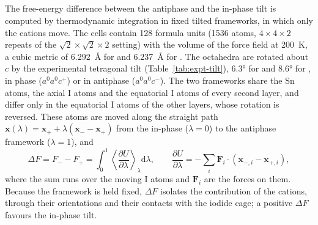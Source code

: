 \subsection{\protect{}}
\label{sec:ti}
{\changedcolor
The free-energy difference between the antiphase and the in-phase tilt is computed by thermodynamic
integration\cite{Kirkwood1935JCP} in fixed tilted frameworks, in which only the cations move. The cells contain 128
formula units (1536 atoms, $4\times4\times2$ repeats of the $\sqrt{2}\times\sqrt{2}\times2$ setting) with the volume of
the force field at \SI{200}{K}, a cubic metric of \SI{6.292}{\angstrom} for \FASnI{} and \SI{6.237}{\angstrom} for
\MASnI{}. The octahedra are rotated about $c$ by the experimental tetragonal tilt (Table~\ref{tab:expt-tilt}), \ang{6.3}
for \FASnI{} and \ang{8.6} for \MASnI{}, in phase ($a^0a^0c^+$) or in antiphase ($a^0a^0c^-$). The two frameworks share
the Sn atoms, the axial I atoms and the equatorial I atoms of every second layer, and differ only in the equatorial I
atoms of the other layers, whose rotation is reversed. These atoms are moved along the straight path
$\mathbf{x}(\lambda) = \mathbf{x}_{+} + \lambda(\mathbf{x}_{-} - \mathbf{x}_{+})$ from the in-phase ($\lambda = 0$) to
the antiphase framework ($\lambda = 1$), and
\begin{equation}
  \Delta F = F_{-} - F_{+} = \int_0^1 \left\langle \frac{\partial U}{\partial\lambda} \right\rangle_\lambda \mathrm{d}\lambda ,
  \qquad
  \frac{\partial U}{\partial\lambda} = -\sum_i \mathbf{F}_i \cdot (\mathbf{x}_{-,i} - \mathbf{x}_{+,i}) ,
\end{equation}
where the sum runs over the moving I atoms and $\mathbf{F}_i$ are the forces on them. Because the framework is held
fixed, $\Delta F$ isolates the contribution of the cations, through their orientations and their contacts with the
iodide cage; a positive $\Delta F$ favours the in-phase tilt.

}
